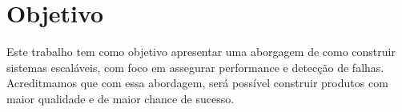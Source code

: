 \chapter{Objetivo}
Este trabalho tem como objetivo apresentar uma aborgagem de como construir
sistemas escaláveis, com foco em assegurar performance e detecção de falhas.
Acreditmamos que com essa abordagem, será possível construir produtos com maior
qualidade e de maior chance de sucesso.
